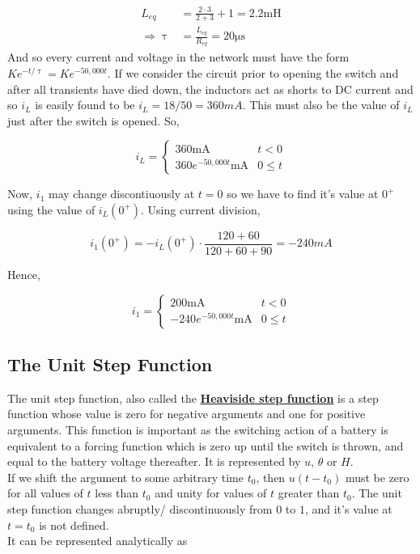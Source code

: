 \documentclass[11pt]{article}
\numberwithin{equation}{section}
\begin{document}
\begin{flushleft}
\begin{tcolorbox}[colback=RedOrange!5, colframe=RedOrange!75!black, title=\textbf{Example 2.2}, breakable]
\begin{align*}
L_{eq} &= \frac{2 \cdot 3}{2+3} + 1 = 2.2 \si{\milli\henry}\\
\Rightarrow \uptau &= \frac{L_{eq}}{R_{eq}} = 20 \si{\micro\second} 
\end{align*}
And so every current and voltage in the network must have the form $Ke^{-t/\uptau}=Ke^{-50,000t}$.
If we consider the circuit prior to opening the switch and after all transients have died down, the
inductors act as shorts to DC current and so $i_L$ is easily found to be $i_L = 18/50 = 360mA$. This must
also be the value of $i_L$ just after the switch is opened. So,

\begin{equation*}
i_L = \begin{cases} 
          360 \si{\milli\ampere} & t < 0 \\
          360e^{-50,000t} \si{\milli\ampere} & 0\leq t 
       \end{cases}
\end{equation*}

Now, $i_1$ may change discontiuously at $t=0$ so we have to find it's value at $0^{+}$ using the value of
$i_L(0^+)$. Using current division,

\begin{equation*}
i_1(0^+) = -i_L(0^+) \cdot \frac{120+60}{120+60+90} = -240 mA
\end{equation*}

Hence,

\begin{equation*}
i_1 = \begin{cases} 
          200 \si{\milli\ampere} & t < 0 \\
          -240e^{-50,000t} \si{\milli\ampere} & 0\leq t 
       \end{cases}
\end{equation*}
\end{tcolorbox}

\color{blue}
\subsection{The Unit Step Function}
\color{black}
The unit step function, also called the \href{https://en.wikipedia.org/wiki/Oliver_Heaviside}
{\textbf{Heaviside step function}} is a step function whose value is zero for negative arguments and
one for positive arguments. This function is important as the switching action of a battery is equivalent
to a forcing function which is zero up until the switch is thrown, and equal to the battery voltage
thereafter. It is represented by $u$, $\theta$ or $H$.\\
If we shift the argument to some arbitrary time $t_0$, then $u(t-t_0)$ must be zero for all values of $t$
less than $t_0$ and unity for values of $t$ greater than $t_0$. The unit step function changes abruptly/
discontinuously from $0$ to $1$, and it's value at $t=t_0$ is not defined.\\
It can be represented analytically as


\end{flushleft}
\end{document}

